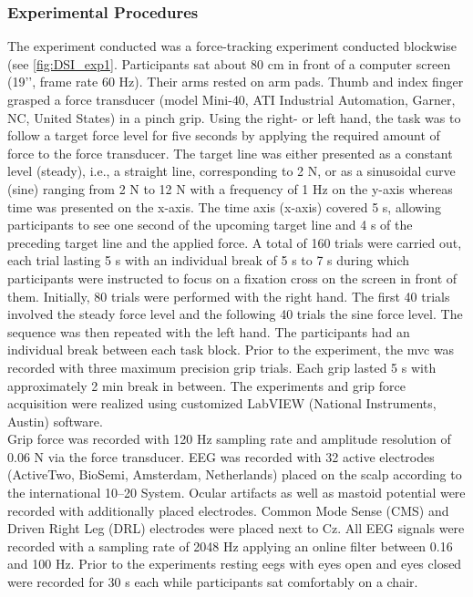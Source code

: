 \subsubsection{Experimental Procedures}
\label{methods:datasets:I:experiment}
The experiment conducted was a force-tracking experiment conducted blockwise (see \autoref{fig:DSI_exp1}. Participants sat about 80 cm in front of a computer screen (19’’, frame rate 60 Hz). Their arms rested on arm pads. Thumb and index finger grasped a force transducer (model Mini-40, ATI Industrial Automation, Garner, NC, United States) in a pinch grip. Using the right- or left hand, the task was to follow a target force level for five seconds by applying the required amount of force to the force transducer. The target line was either presented as a constant level (steady), i.e., a straight line, corresponding to 2 N, or as a sinusoidal curve (sine) ranging from 2 N to 12 N with a frequency of 1 Hz on the y-axis whereas time was presented on the x-axis. The time axis (x-axis) covered 5 s, allowing participants to see one second of the upcoming target line and 4 s of the preceding target line and the applied force. A total of 160 trials were carried out, each trial lasting 5 s with an individual break of 5 s to 7 s during which participants were instructed to focus on a fixation cross on the screen in front of them. Initially, 80 trials were performed with the right hand. The first 40 trials involved the steady force level and the following 40 trials the sine force level. The sequence was then repeated with the left hand. The participants had an individual break between each task block. Prior to the experiment, the \gls{mvc} was recorded with three maximum precision grip trials. Each grip lasted 5 s with approximately 2 min break in between. The experiments and grip force acquisition were realized using customized LabVIEW (National Instruments, Austin) software.\\
Grip force was recorded with 120 Hz sampling rate and amplitude resolution of 0.06 N via the force transducer.
EEG was recorded with 32 active electrodes (ActiveTwo, BioSemi, Amsterdam, Netherlands) placed on the scalp according to the international 10–20 System. Ocular artifacts as well as mastoid potential were recorded with additionally placed electrodes. Common Mode Sense (CMS) and Driven Right Leg (DRL) electrodes were placed next to Cz. All EEG signals were recorded with a sampling rate of 2048 Hz applying an online filter between 0.16 and 100 Hz. Prior to the experiments resting \glspl{eeg} with eyes open and eyes closed were recorded for 30 s each while participants sat comfortably on a chair.

